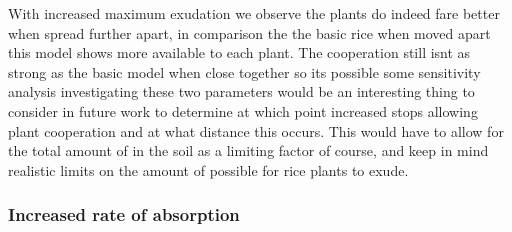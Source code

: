 \documentclass[11pt]{article}
\numberwithin{equation}{section}
\begin{document}
 With increased maximum  exudation we observe the plants do indeed fare better when spread further apart, in comparison the the basic rice when moved apart this model shows more available  to each plant. The cooperation still isnt as strong as the basic model when close together so its possible some sensitivity analysis investigating these two parameters would be an interesting thing to consider in future work to determine at which point increased  stops allowing plant cooperation and at what distance this occurs. This would have to allow for the total amount of  in the soil as a limiting factor of course, and keep in mind realistic limits on the amount of  possible for rice plants to exude. 
 
 \subsubsection{Increased rate of  absorption}
\end{document}
